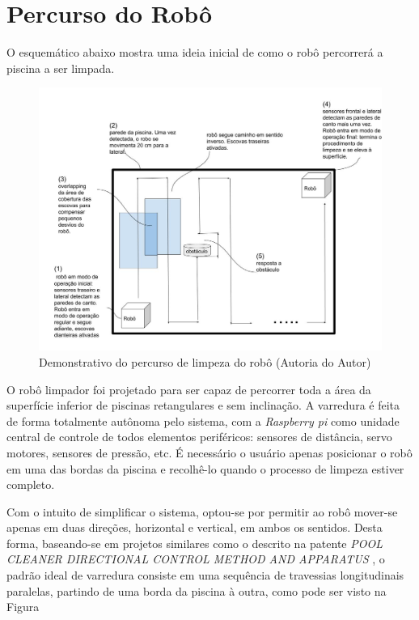 \section{Percurso do Robô}
O esquemático abaixo mostra uma ideia inicial de como o robô percorrerá a piscina
a ser limpada.
\par
\begin{figure}[h]
    \centering
    \includegraphics[width=\textwidth]{figures/schema-way-robot.jpg}
    \caption{Demonstrativo do percurso de limpeza do robô (\textsf{Autoria do Autor})}
    \label{fig:schema-way-robot}
  \end{figure}
\par
O robô limpador foi projetado para ser capaz de percorrer toda a área da superfície
inferior de piscinas retangulares e sem inclinação. A varredura é feita de forma
totalmente autônoma pelo sistema, com a \textit{Raspberry pi} como unidade central de
controle de todos elementos periféricos: sensores de distância, servo motores,
sensores de pressão, etc. É necessário o usuário apenas posicionar o robô em
uma das bordas da piscina e recolhê-lo quando o processo de limpeza estiver completo.
\par
Com o intuito de simplificar o sistema, optou-se por permitir ao robô mover-se apenas
em duas direções, horizontal e vertical, em ambos os sentidos. Desta forma,
baseando-se em projetos similares como o descrito na patente \textit{POOL CLEANER
DIRECTIONAL CONTROL METHOD AND APPARATUS} \cite{porat2001}, o
padrão ideal de varredura consiste em uma sequência de travessias longitudinais
paralelas, partindo de uma borda da piscina à outra, como pode ser visto na Figura
